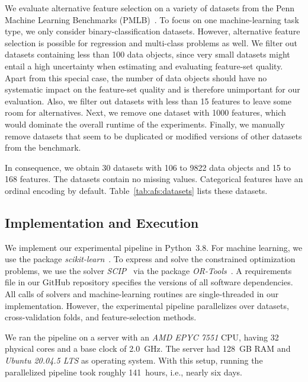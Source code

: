 \documentclass{article}
\theoremstyle{definition}
\begin{document}
%
We evaluate alternative feature selection on a variety of datasets from the Penn Machine Learning Benchmarks (PMLB)~\cite{olson2017pmlb,romano2021pmlb}.
To focus on one machine-learning task type, we only consider binary-classification datasets.
However, alternative feature selection is possible for regression and multi-class problems as well.
We filter out datasets containing less than 100 data objects, since very small datasets might entail a high uncertainty when estimating and evaluating feature-set quality.
Apart from this special case, the number of data objects should have no systematic impact on the feature-set quality and is therefore unimportant for our evaluation.
Also, we filter out datasets with less than 15 features to leave some room for alternatives.
Next, we remove one dataset with 1000 features, which would dominate the overall runtime of the experiments.
Finally, we manually remove datasets that seem to be duplicated or modified versions of other datasets from the benchmark.

In consequence, we obtain 30 datasets with 106 to 9822 data objects and 15 to 168 features.
The datasets contain no missing values.
Categorical features have an ordinal encoding by default.
Table~\ref{tab:afs:datasets} lists these datasets.

\subsection{Implementation and Execution}
\label{sec:afs:experimental-design:implementation}

We implement our experimental pipeline in Python~3.8.
For machine learning, we use the package \emph{scikit-learn}~\cite{pedregosa2011scikit-learn}.
To express and solve the constrained optimization problems, we use the solver \emph{SCIP}~\cite{bestuzheva2021scip} via the package \emph{OR-Tools}~\cite{perron2022or-tools}.
A requirements file in our GitHub repository specifies the versions of all software dependencies.
All calls of solvers and machine-learning routines are single-threaded in our implementation.
However, the experimental pipeline parallelizes over datasets, cross-validation folds, and feature-selection methods.

We ran the pipeline on a server with an \emph{AMD EPYC 7551} CPU, having 32 physical cores and a base clock of 2.0~GHz.
The server had 128~GB RAM and \emph{Ubuntu 20.04.5 LTS} as operating system.
With this setup, running the parallelized pipeline took roughly 141~hours, i.e., nearly six days.
\end{document}
